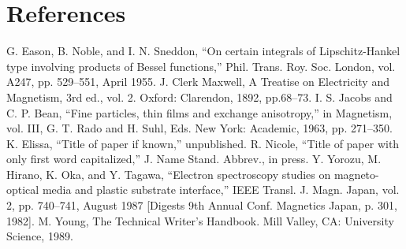 \documentclass[conference]{IEEEtran}
\begin{document}
\section*{References}
\begin{thebibliography}{00}
 G. Eason, B. Noble, and I. N. Sneddon, ``On certain integrals of Lipschitz-Hankel type involving products of Bessel functions,'' Phil. Trans. Roy. Soc. London, vol. A247, pp. 529--551, April 1955.
 J. Clerk Maxwell, A Treatise on Electricity and Magnetism, 3rd ed., vol. 2. Oxford: Clarendon, 1892, pp.68--73.
 I. S. Jacobs and C. P. Bean, ``Fine particles, thin films and exchange anisotropy,'' in Magnetism, vol. III, G. T. Rado and H. Suhl, Eds. New York: Academic, 1963, pp. 271--350.
 K. Elissa, ``Title of paper if known,'' unpublished.
 R. Nicole, ``Title of paper with only first word capitalized,'' J. Name Stand. Abbrev., in press.
 Y. Yorozu, M. Hirano, K. Oka, and Y. Tagawa, ``Electron spectroscopy studies on magneto-optical media and plastic substrate interface,'' IEEE Transl. J. Magn. Japan, vol. 2, pp. 740--741, August 1987 [Digests 9th Annual Conf. Magnetics Japan, p. 301, 1982].
 M. Young, The Technical Writer's Handbook. Mill Valley, CA: University Science, 1989.
\end{thebibliography}
\end{document}

